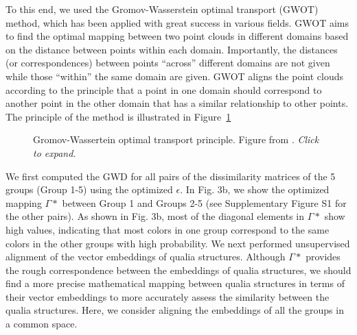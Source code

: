 \documentclass[
  authoryear]{elsarticle}
\begin{document}
To this end, we used the Gromov-Wasserstein optimal transport (GWOT)
method, which has been applied with great success in various fields.
GWOT aims to find the optimal mapping between two point clouds in
different domains based on the distance between points within each
domain. Importantly, the distances (or correspondences) between points
``across'' different domains are not given while those ``within'' the
same domain are given. GWOT aligns the point clouds according to the
principle that a point in one domain should correspond to another point
in the other domain that has a similar relationship to other points. The
principle of the method is illustrated in Figure~\ref{fig-gwot-kawa}

\begin{figure}


\caption{\label{fig-gwot-kawa}Gromov-Wassertein optimal transport
principle. Figure from \citet{kawakita2023}. \emph{Click to expand.}}

\end{figure}%

We first computed the GWD for all pairs of the dissimilarity matrices of
the 5 groups (Group 1-5) using the optimized \(\epsilon\). In Fig. 3b,
we show the optimized mapping \(\Gamma*\) between Group 1 and Groups 2-5
(see Supplementary Figure S1 for the other pairs). As shown in Fig. 3b,
most of the diagonal elements in \(\Gamma*\) show high values,
indicating that most colors in one group correspond to the same colors
in the other groups with high probability. We next performed
unsupervised alignment of the vector embeddings of qualia structures.
Although \(\Gamma*\) provides the rough correspondence between the
embeddings of qualia structures, we should find a more precise
mathematical mapping between qualia structures in terms of their vector
embeddings to more accurately assess the similarity between the qualia
structures. Here, we consider aligning the embeddings of all the groups
in a common space.
\end{document}
